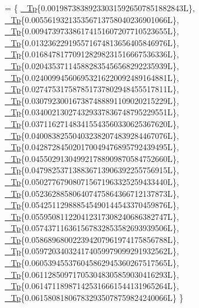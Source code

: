 \begin{DoxyCode}
=
      \{
        \hyperlink{namespace____gnu__cxx_a3b19a9c800ca194374ef9172290f7d79}{\_Tp}\{0.001987383892330315926507851882843L\},
        \hyperlink{namespace____gnu__cxx_a3b19a9c800ca194374ef9172290f7d79}{\_Tp}\{0.005561932135356713758040236901066L\},
        \hyperlink{namespace____gnu__cxx_a3b19a9c800ca194374ef9172290f7d79}{\_Tp}\{0.009473973386174151607207710523655L\},
        \hyperlink{namespace____gnu__cxx_a3b19a9c800ca194374ef9172290f7d79}{\_Tp}\{0.013236229195571674813656405846976L\},
        \hyperlink{namespace____gnu__cxx_a3b19a9c800ca194374ef9172290f7d79}{\_Tp}\{0.016847817709128298231516667536336L\},
        \hyperlink{namespace____gnu__cxx_a3b19a9c800ca194374ef9172290f7d79}{\_Tp}\{0.020435371145882835456568292235939L\},
        \hyperlink{namespace____gnu__cxx_a3b19a9c800ca194374ef9172290f7d79}{\_Tp}\{0.024009945606953216220092489164881L\},
        \hyperlink{namespace____gnu__cxx_a3b19a9c800ca194374ef9172290f7d79}{\_Tp}\{0.027475317587851737802948455517811L\},
        \hyperlink{namespace____gnu__cxx_a3b19a9c800ca194374ef9172290f7d79}{\_Tp}\{0.030792300167387488891109020215229L\},
        \hyperlink{namespace____gnu__cxx_a3b19a9c800ca194374ef9172290f7d79}{\_Tp}\{0.034002130274329337836748795229551L\},
        \hyperlink{namespace____gnu__cxx_a3b19a9c800ca194374ef9172290f7d79}{\_Tp}\{0.037116271483415543560330625367620L\},
        \hyperlink{namespace____gnu__cxx_a3b19a9c800ca194374ef9172290f7d79}{\_Tp}\{0.040083825504032382074839284467076L\},
        \hyperlink{namespace____gnu__cxx_a3b19a9c800ca194374ef9172290f7d79}{\_Tp}\{0.042872845020170049476895792439495L\},
        \hyperlink{namespace____gnu__cxx_a3b19a9c800ca194374ef9172290f7d79}{\_Tp}\{0.045502913049921788909870584752660L\},
        \hyperlink{namespace____gnu__cxx_a3b19a9c800ca194374ef9172290f7d79}{\_Tp}\{0.047982537138836713906392255756915L\},
        \hyperlink{namespace____gnu__cxx_a3b19a9c800ca194374ef9172290f7d79}{\_Tp}\{0.050277679080715671963325259433440L\},
        \hyperlink{namespace____gnu__cxx_a3b19a9c800ca194374ef9172290f7d79}{\_Tp}\{0.052362885806407475864366712137873L\},
        \hyperlink{namespace____gnu__cxx_a3b19a9c800ca194374ef9172290f7d79}{\_Tp}\{0.054251129888545490144543370459876L\},
        \hyperlink{namespace____gnu__cxx_a3b19a9c800ca194374ef9172290f7d79}{\_Tp}\{0.055950811220412317308240686382747L\},
        \hyperlink{namespace____gnu__cxx_a3b19a9c800ca194374ef9172290f7d79}{\_Tp}\{0.057437116361567832853582693939506L\},
        \hyperlink{namespace____gnu__cxx_a3b19a9c800ca194374ef9172290f7d79}{\_Tp}\{0.058689680022394207961974175856788L\},
        \hyperlink{namespace____gnu__cxx_a3b19a9c800ca194374ef9172290f7d79}{\_Tp}\{0.059720340324174059979099291932562L\},
        \hyperlink{namespace____gnu__cxx_a3b19a9c800ca194374ef9172290f7d79}{\_Tp}\{0.060539455376045862945360267517565L\},
        \hyperlink{namespace____gnu__cxx_a3b19a9c800ca194374ef9172290f7d79}{\_Tp}\{0.061128509717053048305859030416293L\},
        \hyperlink{namespace____gnu__cxx_a3b19a9c800ca194374ef9172290f7d79}{\_Tp}\{0.061471189871425316661544131965264L\},
        \hyperlink{namespace____gnu__cxx_a3b19a9c800ca194374ef9172290f7d79}{\_Tp}\{0.061580818067832935078759824240066L\}
      \}
\end{DoxyCode}


